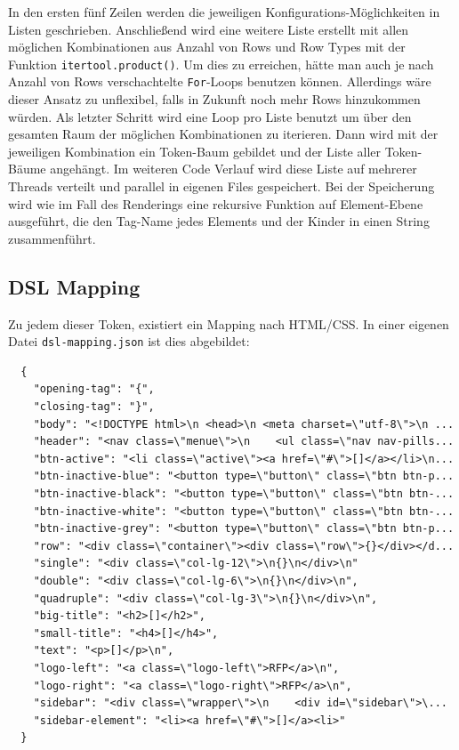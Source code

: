 \documentclass[pdftex,a4paper,halfparskip, article]{scrartcl}
\begin{document}
In den ersten fünf Zeilen werden die jeweiligen Konfigurations-Möglichkeiten in Listen geschrieben. Anschließend wird eine weitere Liste erstellt mit allen möglichen Kombinationen aus Anzahl von Rows und Row Types mit der Funktion \texttt{itertool.product()}. Um dies zu erreichen, hätte man auch je nach Anzahl von Rows verschachtelte \texttt{For}-Loops benutzen können. Allerdings wäre dieser Ansatz zu unflexibel, falls in Zukunft noch mehr Rows hinzukommen würden.
Als letzter Schritt wird eine Loop pro Liste benutzt um über den gesamten Raum der möglichen Kombinationen zu iterieren. Dann wird mit der jeweiligen Kombination ein Token-Baum gebildet und der Liste aller Token-Bäume angehängt. Im weiteren Code Verlauf wird diese Liste auf mehrerer Threads verteilt und parallel in eigenen Files gespeichert.
Bei der Speicherung wird wie im Fall des Renderings eine rekursive Funktion auf Element-Ebene ausgeführt, die den Tag-Name jedes Elements und der Kinder in einen String zusammenführt.

\subsection{DSL Mapping}

Zu jedem dieser Token, existiert ein Mapping nach HTML/CSS. In einer eigenen Datei \texttt{dsl-mapping.json} ist dies abgebildet:

\begin{verbatim}
  {
    "opening-tag": "{",
    "closing-tag": "}",
    "body": "<!DOCTYPE html>\n <head>\n <meta charset=\"utf-8\">\n ...
    "header": "<nav class=\"menue\">\n    <ul class=\"nav nav-pills...
    "btn-active": "<li class=\"active\"><a href=\"#\">[]</a></li>\n...
    "btn-inactive-blue": "<button type=\"button\" class=\"btn btn-p...
    "btn-inactive-black": "<button type=\"button\" class=\"btn btn-...
    "btn-inactive-white": "<button type=\"button\" class=\"btn btn-...
    "btn-inactive-grey": "<button type=\"button\" class=\"btn btn-p...
    "row": "<div class=\"container\"><div class=\"row\">{}</div></d...
    "single": "<div class=\"col-lg-12\">\n{}\n</div>\n"
    "double": "<div class=\"col-lg-6\">\n{}\n</div>\n",
    "quadruple": "<div class=\"col-lg-3\">\n{}\n</div>\n",
    "big-title": "<h2>[]</h2>",
    "small-title": "<h4>[]</h4>",
    "text": "<p>[]</p>\n",
    "logo-left": "<a class=\"logo-left\">RFP</a>\n",
    "logo-right": "<a class=\"logo-right\">RFP</a>\n",
    "sidebar": "<div class=\"wrapper\">\n    <div id=\"sidebar\">\...
    "sidebar-element": "<li><a href=\"#\">[]</a><li>"  
  }
  
\end{verbatim}
\end{document}
